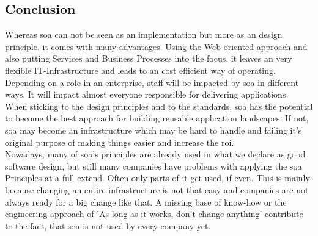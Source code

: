\documentclass[12pt]{article}
\begin{document}
\subsection{Conclusion}
Whereas \gls{soa} can not be seen as an implementation but more as an design principle, it comes with many advantages. Using the Web-oriented approach and also putting Services and Business Processes into the focus, it leaves an very flexible IT-Infrastructure and leads to an cost efficient way of operating.\\
Depending on a role in an enterprise, staff will be impacted by \gls{soa} in different ways. It will impact almost everyone responsible for delivering applications. When sticking to the design principles and to the standards, \gls{soa} has the potential to become the best approach for building reusable application landscapes. If not, \gls{soa} may become an infrastructure which may be hard to handle and failing it's original purpose of making things easier and increase the \gls{roi}.\\
Nowadays, many of \gls{soa}'s principles are already used in what we declare as good software design, but still many companies have problems with applying the \gls{soa} Principles at a full extend. Often only parts of it get used, if even. This is mainly because changing an entire infrastructure is not that easy and companies are not always ready for a big change like that. A missing base of know-how or the engineering approach of 'As long as it works, don't change anything' contribute to the fact, that \gls{soa} is not used by every company yet.






\newpage
\end{document}
